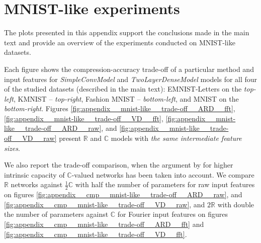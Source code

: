 \documentclass[a4paper,10pt,onecolumn]{article}
\newcommand{\real}{\mathbb{R}}
\newcommand{\cplx}{\mathbb{C}}
\begin{document}

\section{MNIST-like experiments} %
\label{sec:mnist_like_experiments}

The plots presented in this appendix support the conclusions made in the main text and
provide an overview of the experiments conducted on MNIST-like datasets.

Each figure shows the compression-accuracy trade-off of a particular method and input
features for \textit{SimpleConvModel} and \textit{TwoLayerDenseModel} models for all four
of the studied datasets (described in the main text): EMNIST-Letters on the \textit{top-left},
KMNIST -- \textit{top-right}, Fashion MNIST -- \textit{bottom-left}, and MNIST on the
\textit{bottom-right}.
%
Figures \ref{fig:appendix__mnist-like__trade-off__ARD__fft}, \ref{fig:appendix__mnist-like__trade-off__VD__fft},
\ref{fig:appendix__mnist-like__trade-off__ARD__raw}, and \ref{fig:appendix__mnist-like__trade-off__VD__raw}
present $\real$ and $\cplx$ models with \textit{the same intermediate feature sizes}.

We also report the trade-off comparison, when the argument by \citet{monning_evaluation_2018}
for higher intrinsic capacity of $\cplx$-valued networks has been taken into account.
%
We compare $\real$ networks against $\tfrac12 \cplx$ with half the number of parameters
for raw input features on figures \ref{fig:appendix__cmp__mnist-like__trade-off__ARD__raw},
and \ref{fig:appendix__cmp__mnist-like__trade-off__VD__raw}, and $2 \real$ with
double the number of parameters against $\cplx$ for Fourier input features on figures
\ref{fig:appendix__cmp__mnist-like__trade-off__ARD__fft} and
\ref{fig:appendix__cmp__mnist-like__trade-off__VD__fft}.
\end{document}
